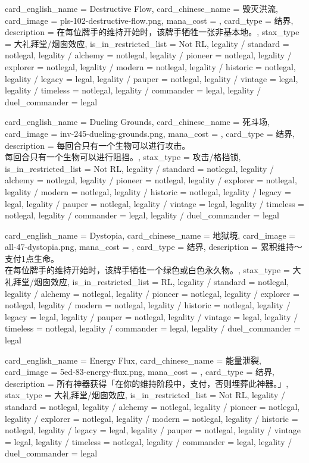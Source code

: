 \documentclass[lang = cn, color = black, 10pt]{AllThatStax}
\begin{document}
\card
{
	card_english_name = {Destructive Flow},
	card_chinese_name = {毁灭洪流},
	card_image = pls-102-destructive-flow.png,
	mana_cost = ,
	card_type = 结界,
	description = {在每位牌手的维持开始时，该牌手牺牲一张非基本地。},
	stax_type = 大礼拜堂/烟囱效应,
	is_in_restricted_list = Not RL,
	legality / standard = notlegal,
	legality / alchemy = notlegal,
	legality / pioneer = notlegal,
	legality / explorer = notlegal,
	legality / modern = notlegal,
	legality / historic = notlegal,
	legality / legacy = legal,
	legality / pauper = notlegal,
	legality / vintage = legal,
	legality / timeless = notlegal,
	legality / commander = legal,
	legality / duel_commander = legal
}

\card
{
	card_english_name = {Dueling Grounds},
	card_chinese_name = {死斗场},
	card_image = inv-245-dueling-grounds.png,
	mana_cost = ,
	card_type = 结界,
	description = {每回合只有一个生物可以进行攻击。\\
每回合只有一个生物可以进行阻挡。},
	stax_type = 攻击/格挡锁,
	is_in_restricted_list = Not RL,
	legality / standard = notlegal,
	legality / alchemy = notlegal,
	legality / pioneer = notlegal,
	legality / explorer = notlegal,
	legality / modern = notlegal,
	legality / historic = notlegal,
	legality / legacy = legal,
	legality / pauper = notlegal,
	legality / vintage = legal,
	legality / timeless = notlegal,
	legality / commander = legal,
	legality / duel_commander = legal
}

\card
{
	card_english_name = {Dystopia},
	card_chinese_name = {地狱境},
	card_image = all-47-dystopia.png,
	mana_cost = ,
	card_type = 结界,
	description = {累积维持～支付1点生命。\\
在每位牌手的维持开始时，该牌手牺牲一个绿色或白色永久物。},
	stax_type = 大礼拜堂/烟囱效应,
	is_in_restricted_list = RL,
	legality / standard = notlegal,
	legality / alchemy = notlegal,
	legality / pioneer = notlegal,
	legality / explorer = notlegal,
	legality / modern = notlegal,
	legality / historic = notlegal,
	legality / legacy = legal,
	legality / pauper = notlegal,
	legality / vintage = legal,
	legality / timeless = notlegal,
	legality / commander = legal,
	legality / duel_commander = legal
}

\card
{
	card_english_name = {Energy Flux},
	card_chinese_name = {能量泄裂},
	card_image = 5ed-83-energy-flux.png,
	mana_cost = ,
	card_type = 结界,
	description = {所有神器获得「在你的维持阶段中，支付，否则埋葬此神器。」},
	stax_type = 大礼拜堂/烟囱效应,
	is_in_restricted_list = Not RL,
	legality / standard = notlegal,
	legality / alchemy = notlegal,
	legality / pioneer = notlegal,
	legality / explorer = notlegal,
	legality / modern = notlegal,
	legality / historic = notlegal,
	legality / legacy = legal,
	legality / pauper = notlegal,
	legality / vintage = legal,
	legality / timeless = notlegal,
	legality / commander = legal,
	legality / duel_commander = legal
}
\end{document}
